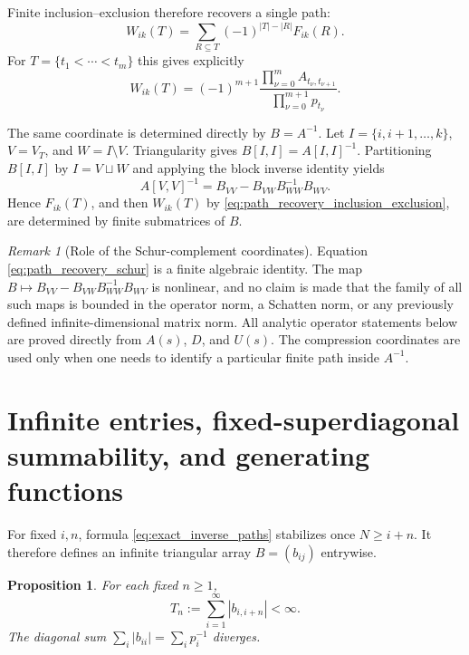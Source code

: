 \documentclass[11pt]{amsart}
\numberwithin{equation}{section}
\theoremstyle{plain}
\newtheorem{proposition}[theorem]{Proposition}
\theoremstyle{definition}
\theoremstyle{remark}
\newtheorem{remark}[theorem]{Remark}
\begin{document}
Finite inclusion--exclusion therefore recovers a single path:
\begin{equation}
\boxed{
W_{ik}(T)=\sum_{R\subseteq T}(-1)^{|T|-|R|}F_{ik}(R).
}
\label{eq:path_recovery_inclusion_exclusion}
\end{equation}
For $T=\{t_1<\cdots<t_m\}$ this gives explicitly
\begin{equation}
\boxed{
W_{ik}(T)=(-1)^{m+1}
\frac{\prod_{\nu=0}^{m}A_{t_\nu,t_{\nu+1}}}
{\prod_{\nu=0}^{m+1}p_{t_\nu}}.
}
\label{eq:path_recovery_explicit}
\end{equation}

The same coordinate is determined directly by $B=A^{-1}$.  Let $I=\{i,i+1,\ldots,k\}$, $V=V_T$, and $W=I\setminus V$.  Triangularity gives $B[I,I]=A[I,I]^{-1}$.  Partitioning $B[I,I]$ by $I=V\sqcup W$ and applying the block inverse identity yields
\begin{equation}
\boxed{
A[V,V]^{-1}
=B_{VV}-B_{VW}B_{WW}^{-1}B_{WV}.
}
\label{eq:path_recovery_schur}
\end{equation}
Hence $F_{ik}(T)$, and then $W_{ik}(T)$ by \eqref{eq:path_recovery_inclusion_exclusion}, are determined by finite submatrices of $B$.

\begin{remark}[Role of the Schur-complement coordinates]
\label{rem:schur_coordinate_scope}
Equation \eqref{eq:path_recovery_schur} is a finite algebraic identity.  The map $B\mapsto B_{VV}-B_{VW}B_{WW}^{-1}B_{WV}$ is nonlinear, and no claim is made that the family of all such maps is bounded in the operator norm, a Schatten norm, or any previously defined infinite-dimensional matrix norm.  All analytic operator statements below are proved directly from $A(s)$, $D$, and $U(s)$.  The compression coordinates are used only when one needs to identify a particular finite path inside $A^{-1}$.
\end{remark}

\section{Infinite entries, fixed-superdiagonal summability, and generating functions}
\label{sec:superdiagonal_limits}

For fixed $i,n$, formula \eqref{eq:exact_inverse_paths} stabilizes once $N\ge i+n$.  It therefore defines an infinite triangular array $B=(b_{ij})$ entrywise.

\begin{proposition}
\label{prop:fixed_superdiag_sum}
For each fixed $n\ge1$,
\begin{equation}
T_n:=\sum_{i=1}^{\infty}|b_{i,i+n}|<\infty.
\label{eq:Tn_definition}
\end{equation}
The diagonal sum $\sum_i|b_{ii}|=\sum_i p_i^{-1}$ diverges.
\end{proposition}
\end{document}
